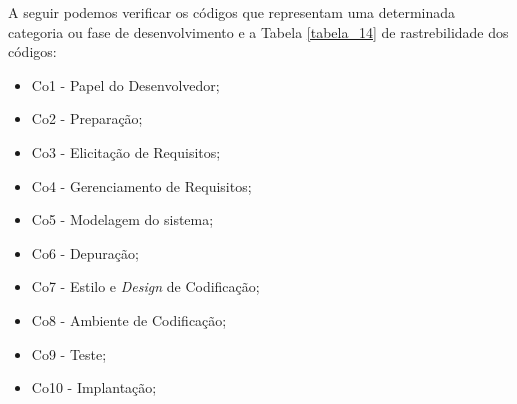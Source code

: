 A seguir podemos verificar os códigos que representam uma determinada categoria ou fase de desenvolvimento e a Tabela \ref{tabela_14} de rastrebilidade dos códigos:

\begin{itemize}
\item Co1 - Papel do Desenvolvedor;
\item Co2 - Preparação;
\item Co3 - Elicitação de Requisitos;
\item Co4 - Gerenciamento de Requisitos;
\item Co5 - Modelagem do sistema;
\item Co6 - Depuração;
\item Co7 - Estilo e \textit{Design} de Codificação;
\item Co8 - Ambiente de Codificação;
\item Co9 - Teste;
\item Co10 - Implantação;
\end{itemize}

